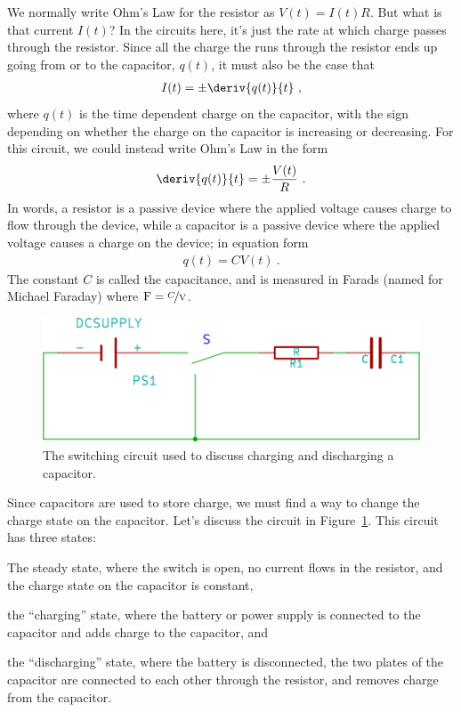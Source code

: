 \documentclass[12pt]{article}
\begin{document}
We normally write Ohm's Law for the resistor as $V(t) = I(t) R$.  But
what is that current $I(t)$?  In the circuits here, it's just the rate
at which charge passes through the resistor.  Since all the charge the
runs through the resistor ends up going from or to the capacitor,
$q(t)$, it must also be the case that
\begin{gather*}
  I(t) = \pm \deriv{q(t)}{t}\ ,
\end{gather*}
where $q(t)$ is the time dependent charge on the capacitor, with the
sign depending on whether the charge on the capacitor is increasing or
decreasing.  For this circuit, we could instead write Ohm's Law in the
form
\begin{gather*}
  \deriv{q(t)}{t} = \pm \frac{V(t)}{R}\ .
\end{gather*}
In words, a resistor is a passive device where the applied voltage
causes charge to flow through the device, while a capacitor is a
passive device where the applied voltage causes a charge on the
device; in equation form
\begin{gather*}
  q(t) = C V(t)\ .
\end{gather*}
The constant $C$ is called the capacitance, and is measured in Farads
(named for Michael Faraday) where $\unit{F} = \unit{\nicefrac{C}{V}}$.

\begin{figure}
  \centering
  \includegraphics[width=2\textwidth/3]{figures/switch-circuit}
  \caption{The switching circuit used to discuss charging and
    discharging a capacitor.} 
  \label{fig:circuit}
\end{figure}
Since capacitors are used to store charge, we must find a way to
change the charge state on the capacitor.  Let's discuss the circuit
in Figure~\ref{fig:circuit}.  This circuit has three states:
\begin{inparaenum}
\item The steady state, where the switch is open, no current flows in
  the resistor, and the charge state on the capacitor is constant,
\item the ``charging'' state, where the battery or power supply is
  connected to the capacitor and adds charge to the capacitor, and
\item the ``discharging'' state, where the battery is disconnected,
  the two plates of the capacitor are connected to each other
  through the resistor, and removes charge from the capacitor.
\end{inparaenum}
\end{document}
